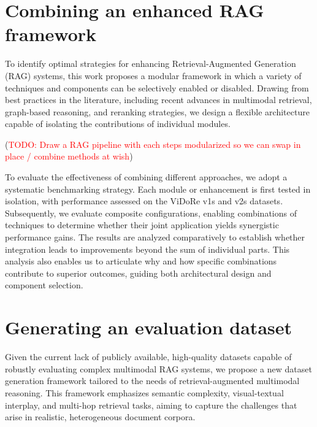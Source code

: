 \documentclass[12pt,twoside]{report}
\begin{document}
\section{Combining an enhanced RAG framework}
To identify optimal strategies for enhancing Retrieval-Augmented Generation (RAG) systems, this work proposes a modular framework in which a variety of techniques and components can be selectively enabled or disabled. Drawing from best practices in the literature, including recent advances in multimodal retrieval, graph-based reasoning, and reranking strategies, we design a flexible architecture capable of isolating the contributions of individual modules.

(\textcolor{red}{TODO: Draw a RAG pipeline with each steps modularized so we can swap in place / combine methods at wish})

To evaluate the effectiveness of combining different approaches, we adopt a systematic benchmarking strategy. Each module or enhancement is first tested in isolation, with performance assessed on the ViDoRe\cite{ColPali} v1s and v2s datasets. Subsequently, we evaluate composite configurations, enabling combinations of techniques to determine whether their joint application yields synergistic performance gains. The results are analyzed comparatively to establish whether integration leads to improvements beyond the sum of individual parts. This analysis also enables us to articulate why and how specific combinations contribute to superior outcomes, guiding both architectural design and component selection.

\section{Generating an evaluation dataset}
Given the current lack of publicly available, high-quality datasets capable of robustly evaluating complex multimodal RAG systems, we propose a new dataset generation framework tailored to the needs of retrieval-augmented multimodal reasoning. This framework emphasizes semantic complexity, visual-textual interplay, and multi-hop retrieval tasks, aiming to capture the challenges that arise in realistic, heterogeneous document corpora.
\end{document}
